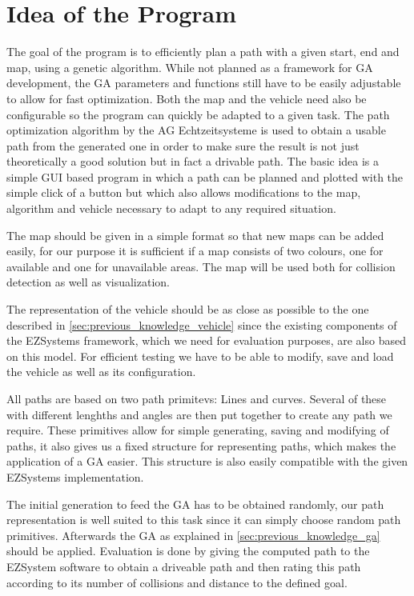 \chapter{Idea of the Program}
\label{cha:program_idea}

The goal of the program is to efficiently plan a path with a given start, end and map, using a genetic algorithm. While not planned as a framework for GA development, the GA parameters and functions still have to be easily adjustable to allow for fast optimization. Both the map and the vehicle need also be configurable so the program can quickly be adapted to a given task. The path optimization algorithm by the AG Echtzeitsysteme is used to obtain a usable path from the generated one in order to make sure the result is not just theoretically a good solution but in fact a drivable path.
The basic idea is a simple GUI based program in which a path can be planned and plotted with the simple click of a button but which also allows modifications to the map, algorithm and vehicle necessary to adapt to any required situation.

The map should be given in a simple format so that new maps can be added easily, for our purpose it is sufficient if a map consists of two colours, one for available and one for unavailable areas. The map will be used both for collision detection as well as visualization.

The representation of the vehicle should be as close as possible to the one described in \ref{sec:previous_knowledge_vehicle} since the existing components of the EZSystems framework, which we need for evaluation purposes, are also based on this model. For efficient testing we have to be able to modify, save and load the vehicle as well as its configuration.

All paths are based on two path primitevs: Lines and curves. Several of these with different lenghths and angles are then put together to create any path we require. These primitives allow for simple generating, saving and modifying of paths, it also gives us a fixed structure for representing paths, which makes the application of a GA easier. This structure is also easily compatible with the given EZSystems implementation.

The initial generation to feed the GA has to be obtained randomly, our path representation is well suited to this task since it can simply choose random path primitives. Afterwards the GA as explained in \ref{sec:previous_knowledge_ga} should be applied. Evaluation is done by giving the computed path to the EZSystem software to obtain a driveable path and then rating this path according to its number of collisions and distance to the defined goal.